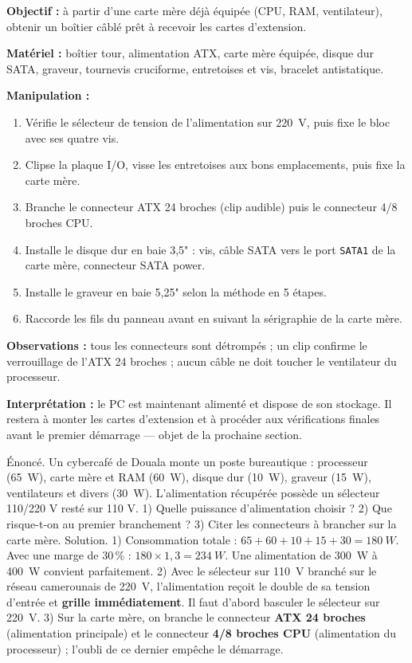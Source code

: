 \documentclass[11pt]{article}
\begin{document}
\begin{experience}
\textbf{Objectif :} à partir d'une carte mère déjà équipée (CPU, RAM, ventilateur), obtenir un boîtier câblé prêt à recevoir les cartes d'extension.\par
\textbf{Matériel :} boîtier tour, alimentation ATX, carte mère équipée, disque dur SATA, graveur, tournevis cruciforme, entretoises et vis, bracelet antistatique.\par
\textbf{Manipulation :}
\begin{enumerate}
\item Vérifie le sélecteur de tension de l'alimentation sur \SI{220}{V}, puis fixe le bloc avec ses quatre vis.
\item Clipse la plaque I/O, visse les entretoises aux bons emplacements, puis fixe la carte mère.
\item Branche le connecteur ATX 24 broches (clip audible) puis le connecteur 4/8 broches CPU.
\item Installe le disque dur en baie 3,5" : vis, câble SATA vers le port \texttt{SATA1} de la carte mère, connecteur SATA power.
\item Installe le graveur en baie 5,25" selon la méthode en 5 étapes.
\item Raccorde les fils du panneau avant en suivant la sérigraphie de la carte mère.
\end{enumerate}
\textbf{Observations :} tous les connecteurs sont détrompés ; un clip confirme le verrouillage de l'ATX 24 broches ; aucun câble ne doit toucher le ventilateur du processeur.\par
\textbf{Interprétation :} le PC est maintenant alimenté et dispose de son stockage. Il restera à monter les cartes d'extension et à procéder aux vérifications finales avant le premier démarrage — objet de la prochaine section.
\end{experience}

\begin{exoresolu}
Énoncé. Un cybercafé de Douala monte un poste bureautique : processeur (\SI{65}{W}), carte mère et RAM (\SI{60}{W}), disque dur (\SI{10}{W}), graveur (\SI{15}{W}), ventilateurs et divers (\SI{30}{W}). L'alimentation récupérée possède un sélecteur 110/220 V resté sur 110 V. 1) Quelle puissance d'alimentation choisir ? 2) Que risque-t-on au premier branchement ? 3) Citer les connecteurs à brancher sur la carte mère.
\tcblower
Solution. 1) Consommation totale : $65 + 60 + 10 + 15 + 30 = \SI{180}{W}$. Avec une marge de 30\,\% : $180 \times 1{,}3 = \SI{234}{W}$. Une alimentation de \SI{300}{W} à \SI{400}{W} convient parfaitement. 2) Avec le sélecteur sur \SI{110}{V} branché sur le réseau camerounais de \SI{220}{V}, l'alimentation reçoit le double de sa tension d'entrée et \textbf{grille immédiatement}. Il faut d'abord basculer le sélecteur sur \SI{220}{V}. 3) Sur la carte mère, on branche le connecteur \textbf{ATX 24 broches} (alimentation principale) et le connecteur \textbf{4/8 broches CPU} (alimentation du processeur) ; l'oubli de ce dernier empêche le démarrage.
\end{exoresolu}
\end{document}
